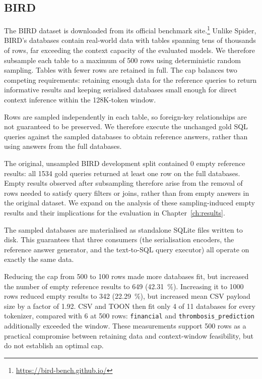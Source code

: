 \subsection{BIRD}

The BIRD dataset is downloaded from its official benchmark
site.\footnote{\url{https://bird-bench.github.io/}} Unlike Spider, BIRD's databases contain real-world data
with tables spanning tens of thousands of rows, far exceeding the context capacity of the evaluated models.
We therefore subsample each table to a maximum of \num{500} rows using deterministic random sampling. Tables
with fewer rows are retained in full. The cap balances two competing requirements: retaining enough data for
the reference queries to return informative results and keeping serialised databases small enough for direct
context inference within the \num{128}K-token window.

Rows are sampled independently in each table, so foreign-key relationships are not guaranteed to be
preserved. We therefore execute the unchanged gold SQL queries against the sampled databases to obtain
reference answers, rather than using answers from the full databases.

The original, unsampled BIRD development split contained \num{0} empty reference results: all \num{1534} gold
queries returned at least one row on the full databases. Empty results observed after subsampling therefore
arise from the removal of rows needed to satisfy query filters or joins, rather than from empty answers in
the original dataset. We expand on the analysis of these sampling-induced empty results and their
implications for the evaluation in Chapter~\ref{ch:results}.

The sampled databases are materialised as standalone SQLite files written to disk. This guarantees that three
consumers (the serialisation encoders, the reference answer generator, and the text-to-SQL query executor)
all operate on exactly the same data.

Reducing the cap from \num{500} to \num{100} rows made more databases fit, but increased the number of empty
reference results to \num{649} (\qty{42.31}{\percent}). Increasing it to \num{1000} rows reduced empty
results to \num{342} (\qty{22.29}{\percent}), but increased mean CSV payload size by a factor of \num{1.92}.
CSV and TOON then fit only \num{4} of \num{11} databases for every tokenizer, compared with \num{6} at
\num{500} rows: \texttt{financial} and \texttt{thrombosis\_prediction} additionally exceeded the window.
These measurements support \num{500} rows as a practical compromise between retaining data and context-window
feasibility, but do not establish an optimal cap.


